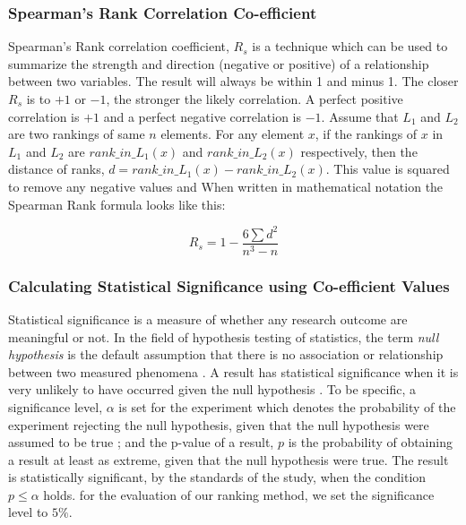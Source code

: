 \documentclass[sigconf]{acmart}
\begin{document}
\subsubsection{Spearman's Rank Correlation Co-efficient}
Spearman’s Rank correlation coefficient, $R_s$ is a technique which can be used to summarize the strength and direction (negative or positive) of a relationship between two variables.
The result will always be within 1 and minus 1. The closer $R_s$ is to $+1$ or $-1$, the stronger the likely correlation. A perfect positive correlation is $+1$ and a perfect negative correlation is $-1$. Assume that $L_1$ and $L_2$ are two rankings of same $n$ elements. For any element $x$, if the rankings of $x$ in $L_1$ and $L_2$ are $rank\_in\_L_1(x)$ and $rank\_in\_L_2(x)$ respectively, then the distance of ranks, $d = rank\_in\_L_1(x) - rank\_in\_L_2(x)$. This value is squared to remove any negative values and When written in mathematical notation the Spearman Rank formula looks like this:

\begin{equation}
R_s = 1-  \dfrac{6\sum d^2}{n^3-n}
\end{equation}
 
\subsubsection{Calculating Statistical Significance using Co-efficient Values}
Statistical significance is a measure of whether any research outcome are meaningful or not. In the field of hypothesis testing of statistics, the term \textit{null hypothesis} is the default assumption that there is no association or relationship between two measured phenomena \cite{DictionaryofStatistics}. A result has statistical significance when it is very unlikely to have occurred given the null hypothesis \cite{myers2010developing}. To be specific, a significance level, $\alpha$ is set for the experiment which denotes the probability of the experiment rejecting the null hypothesis, given that the null hypothesis were assumed to be true \cite{dalgaard2011}; and the p-value of a result, $p$ is the probability of obtaining a result at least as extreme, given that the null hypothesis were true. The result is statistically significant, by the standards of the study, when the condition $p \leq \alpha$ holds\cite{johnson2013revised,redmond2001biostatistics,cumming2013understanding,krzywinski2013points,devore2011probability}.
for the evaluation of our ranking method, we set the significance level to $5\%$.
\end{document}
